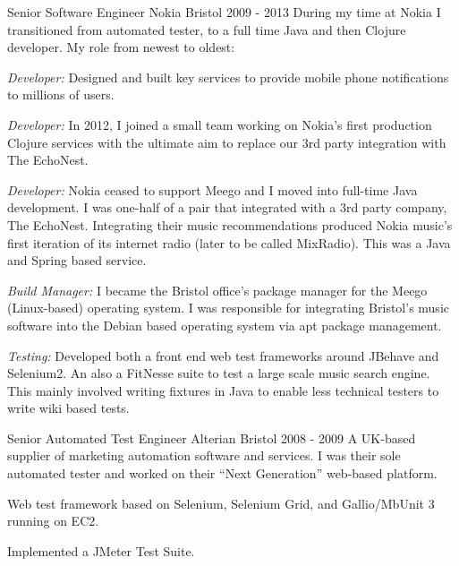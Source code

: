 \begin{cventries}
  \cventrypara
    {Senior Software Engineer} %
    {Nokia } %
    {Bristol} %
    {2009  - 2013} %
    {During my time at Nokia I transitioned from automated tester, to a full time Java and then Clojure developer. My role from newest to oldest:}
    {
      \begin{cvitems} %
        \item {\emph{Developer:} Designed and built key services to provide mobile phone notifications to millions of users.}
        \item {\emph{Developer:} In 2012, I joined a small team working on Nokia's first production Clojure services with the ultimate aim to replace our 3rd party integration with The EchoNest.}
        \item {\emph{Developer:} Nokia ceased to support Meego and I moved into full-time Java development. I was one-half of a pair that integrated with a 3rd party company, The EchoNest. Integrating their music recommendations produced Nokia music’s first iteration of its internet radio (later to be called MixRadio). This was a Java and Spring based service.}
        \item {\emph{Build Manager:} I became the Bristol office's package manager for the Meego (Linux-based) operating system. I was responsible for integrating Bristol's music software into the Debian based operating system via apt package management.}
        \item {\emph{Testing:} Developed both a front end web test frameworks around JBehave and Selenium2. An also a  FitNesse suite to test a large scale music search engine. This mainly involved writing fixtures in Java to enable less technical testers to write wiki based tests.}
      \end{cvitems}
    }

  \cventrypara
    {Senior Automated Test Engineer} %
    {Alterian} %
    {Bristol} %
    {2008  - 2009} %
    {A UK-based supplier of marketing automation software and services. I was their sole automated tester and worked on their “Next Generation” web-based platform.}
    {
      \begin{cvitems} %
        \item {Web test framework based on Selenium, Selenium Grid, and Gallio/MbUnit 3 running on EC2.}
        \item {Implemented a JMeter Test Suite.}
      \end{cvitems}
    }


\end{cventries}
